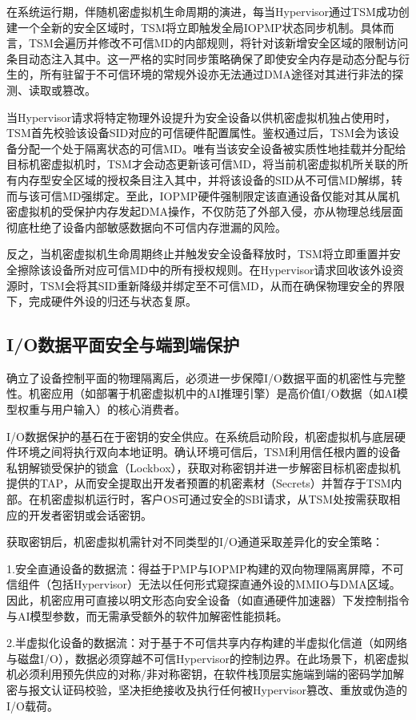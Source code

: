\documentclass[master, vlined, review]{DissertUESTC}
\begin{document}
	在系统运行期，伴随机密虚拟机生命周期的演进，每当Hypervisor通过TSM成功创建一个全新的安全区域时，TSM将立即触发全局IOPMP状态同步机制。具体而言，TSM会遍历并修改不可信MD的内部规则，将针对该新增安全区域的限制访问条目动态注入其中。这一严格的实时同步策略确保了即使安全内存是动态分配与衍生的，所有驻留于不可信环境的常规外设亦无法通过DMA途径对其进行非法的探测、读取或篡改。
	
	当Hypervisor请求将特定物理外设提升为安全设备以供机密虚拟机独占使用时，TSM首先校验该设备SID对应的可信硬件配置属性。鉴权通过后，TSM会为该设备分配一个处于隔离状态的可信MD。唯有当该安全设备被实质性地挂载并分配给目标机密虚拟机时，TSM才会动态更新该可信MD，将当前机密虚拟机所关联的所有内存型安全区域的授权条目注入其中，并将该设备的SID从不可信MD解绑，转而与该可信MD强绑定。至此，IOPMP硬件强制限定该直通设备仅能对其从属机密虚拟机的受保护内存发起DMA操作，不仅防范了外部入侵，亦从物理总线层面彻底杜绝了设备内部敏感数据向不可信内存泄漏的风险。
	
	反之，当机密虚拟机生命周期终止并触发安全设备释放时，TSM将立即重置并安全擦除该设备所对应可信MD中的所有授权规则。在Hypervisor请求回收该外设资源时，TSM会将其SID重新降级并绑定至不可信MD，从而在确保物理安全的界限下，完成硬件外设的归还与状态复原。

	\subsection{I/O数据平面安全与端到端保护}
	确立了设备控制平面的物理隔离后，必须进一步保障I/O数据平面的机密性与完整性。机密应用（如部署于机密虚拟机中的AI推理引擎）是高价值I/O数据（如AI模型权重与用户输入）的核心消费者。

	I/O数据保护的基石在于密钥的安全供应。在系统启动阶段，机密虚拟机与底层硬件环境之间将执行双向本地证明。确认环境可信后，TSM利用信任根内置的设备私钥解锁受保护的锁盒（Lockbox），获取对称密钥并进一步解密目标机密虚拟机提供的TAP，从而安全提取出开发者预置的机密素材（Secrets）并暂存于TSM内部。在机密虚拟机运行时，客户OS可通过安全的SBI请求，从TSM处按需获取相应的开发者密钥或会话密钥。

	获取密钥后，机密虚拟机需针对不同类型的I/O通道采取差异化的安全策略：
	
	1.安全直通设备的数据流：得益于PMP与IOPMP构建的双向物理隔离屏障，不可信组件（包括Hypervisor）无法以任何形式窥探直通外设的MMIO与DMA区域。因此，机密应用可直接以明文形态向安全设备（如直通硬件加速器）下发控制指令与AI模型参数，而无需承受额外的软件加解密性能损耗。

	2.半虚拟化设备的数据流：对于基于不可信共享内存构建的半虚拟化信道（如网络与磁盘I/O），数据必须穿越不可信Hypervisor的控制边界。在此场景下，机密虚拟机必须利用预先供应的对称/非对称密钥，在软件栈顶层实施端到端的密码学加解密与报文认证码校验，坚决拒绝接收及执行任何被Hypervisor篡改、重放或伪造的I/O载荷。
\end{document}

